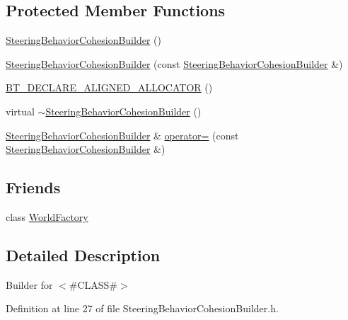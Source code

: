 \subsection*{Protected Member Functions}
\begin{DoxyCompactItemize}
\item 
\mbox{\hyperlink{classnjli_1_1_steering_behavior_cohesion_builder_a9d5b11ed45f08075e0547a9def63b54a}{Steering\+Behavior\+Cohesion\+Builder}} ()
\item 
\mbox{\hyperlink{classnjli_1_1_steering_behavior_cohesion_builder_ae36e72e74e00537445a1533df24da4d2}{Steering\+Behavior\+Cohesion\+Builder}} (const \mbox{\hyperlink{classnjli_1_1_steering_behavior_cohesion_builder}{Steering\+Behavior\+Cohesion\+Builder}} \&)
\item 
\mbox{\hyperlink{classnjli_1_1_steering_behavior_cohesion_builder_a78ae616c5d77861d88f5499dbe7aff3c}{B\+T\+\_\+\+D\+E\+C\+L\+A\+R\+E\+\_\+\+A\+L\+I\+G\+N\+E\+D\+\_\+\+A\+L\+L\+O\+C\+A\+T\+OR}} ()
\item 
virtual \mbox{\hyperlink{classnjli_1_1_steering_behavior_cohesion_builder_a9dbdf2fd25f026574cd8266876300aae}{$\sim$\+Steering\+Behavior\+Cohesion\+Builder}} ()
\item 
\mbox{\hyperlink{classnjli_1_1_steering_behavior_cohesion_builder}{Steering\+Behavior\+Cohesion\+Builder}} \& \mbox{\hyperlink{classnjli_1_1_steering_behavior_cohesion_builder_a4232e2d9cd367c5ab1920945e82a265f}{operator=}} (const \mbox{\hyperlink{classnjli_1_1_steering_behavior_cohesion_builder}{Steering\+Behavior\+Cohesion\+Builder}} \&)
\end{DoxyCompactItemize}
\subsection*{Friends}
\begin{DoxyCompactItemize}
\item 
class \mbox{\hyperlink{classnjli_1_1_steering_behavior_cohesion_builder_acb96ebb09abe8f2a37a915a842babfac}{World\+Factory}}
\end{DoxyCompactItemize}


\subsection{Detailed Description}
Builder for $<$\#\+C\+L\+A\+SS\#$>$ 

Definition at line 27 of file Steering\+Behavior\+Cohesion\+Builder.\+h.




